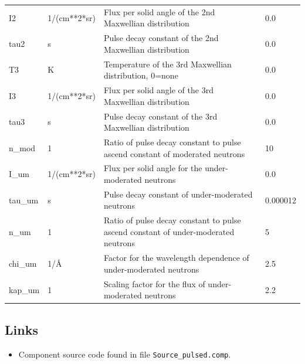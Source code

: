 \begin{longtable}{p{}p{}p{}p{}}
I2 & 1/(cm**2*sr) & Flux per solid angle of the 2nd Maxwellian distribution & 0.0 \\
tau2 & s & Pulse decay constant of the 2nd Maxwellian distribution & 0.0 \\
T3 & K & Temperature of the 3rd Maxwellian distribution, 0=none & 0.0 \\
I3 & 1/(cm**2*sr) & Flux per solid angle of the 3rd Maxwellian distribution & 0.0 \\
tau3 & s & Pulse decay constant of the 3rd Maxwellian distribution & 0.0 \\
n\_mod & 1 & Ratio of pulse decay constant to pulse ascend constant of moderated neutrons & 10 \\
I\_um & 1/(cm**2*sr) & Flux per solid angle for the under-moderated neutrons & 0.0 \\
tau\_um & s & Pulse decay constant of under-moderated neutrons & 0.000012 \\
n\_um & 1 & Ratio of pulse decay constant to pulse ascend constant of under-moderated neutrons & 5 \\
chi\_um & 1/\AA{} & Factor for the wavelength dependence of under-moderated neutrons & 2.5 \\
kap\_um & 1 & Scaling factor for the flux of under-moderated neutrons & 2.2 \\
\bottomrule
\end{longtable}

\subsection*{Links}
\begin{itemize}
  \item Component source code found in file \texttt{Source\_pulsed.comp}.
\end{itemize}
